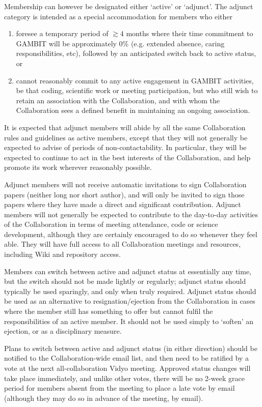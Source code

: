 Membership can however be designated either `active' or `adjunct'.  The adjunct category is intended as a special accommodation for members who either
\begin{enumerate}
\item foresee a temporary period of $\gtrsim$4 months where their time commitment to GAMBIT will be approximately 0\% (e.g. extended absence, caring responsibilities, etc), followed by an anticipated switch back to active status, or
\item cannot reasonably commit to any active engagement in GAMBIT activities, be that coding, scientific work or meeting participation, but who still wish to retain an association with the Collaboration, and with whom the Collaboration sees a defined benefit in maintaining an ongoing association.
\end{enumerate}
It is expected that adjunct members will abide by all the same Collaboration rules and guidelines as active members, except that they will not generally be expected to advise of periods of non-contactability.  In particular, they will be expected to continue to act in the best interests of the Collaboration, and help promote its work wherever reasonably possible.

Adjunct members will not receive automatic invitations to sign Collaboration papers (neither long nor short author), and will only be invited to sign those papers where they have made a direct and significant contribution.  Adjunct members will not generally be expected to contribute to the day-to-day activities of the Collaboration in terms of meeting attendance, code or science development, although they are certainly encouraged to do so whenever they feel able.  They will have full access to all Collaboration meetings and resources, including Wiki and repository access.

Members can switch between active and adjunct status at essentially any time, but the switch should not be made lightly or regularly; adjunct status should typically be used sparingly, and only when truly required.  Adjunct status should be used as an alternative to resignation/ejection from the Collaboration in cases where the member still has something to offer but cannot fulfil the responsibilities of an active member.  It should not be used simply to `soften' an ejection, or as a disciplinary measure.

Plans to switch between active and adjunct status (in either direction) should be notified to the Collaboration-wide email list, and then need to be ratified by a vote at the next all-collaboration Vidyo meeting.  Approved status changes will take place immediately, and unlike other votes, there will be no 2-week grace period for members absent from the meeting to place a late vote by email (although they may do so in advance of the meeting, by email).

